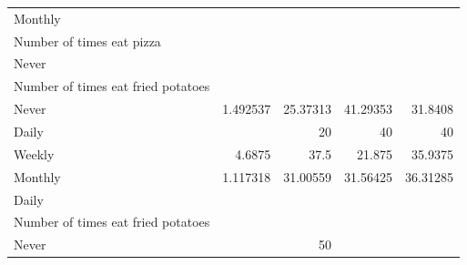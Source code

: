 \documentclass{article}
\begin{document}
\begin{table}[!h]
{\begin{tabular}{lllll}
			\multicolumn{1}{l}{\hspace{1em}Monthly} &
			\multicolumn{1}{|r}{} &
			\multicolumn{1}{r}{} &
			\multicolumn{1}{r}{} &
			\multicolumn{1}{r}{} \\
			\multicolumn{1}{l}{\hspace{2em}Number of times eat pizza} &
			\multicolumn{1}{|r}{} &
			\multicolumn{1}{r}{} &
			\multicolumn{1}{r}{} &
			\multicolumn{1}{r}{} \\
			\multicolumn{1}{l}{\hspace{3em}Never} &
			\multicolumn{1}{|r}{} &
			\multicolumn{1}{r}{} &
			\multicolumn{1}{r}{} &
			\multicolumn{1}{r}{} \\
			\multicolumn{1}{l}{\hspace{4em}Number of times eat fried potatoes} &
			\multicolumn{1}{|r}{} &
			\multicolumn{1}{r}{} &
			\multicolumn{1}{r}{} &
			\multicolumn{1}{r}{} \\
			\multicolumn{1}{l}{\hspace{5em}Never} &
			\multicolumn{1}{|r}{1.492537} &
			\multicolumn{1}{r}{25.37313} &
			\multicolumn{1}{r}{41.29353} &
			\multicolumn{1}{r}{31.8408} \\
			\multicolumn{1}{l}{\hspace{5em}Daily} &
			\multicolumn{1}{|r}{} &
			\multicolumn{1}{r}{20} &
			\multicolumn{1}{r}{40} &
			\multicolumn{1}{r}{40} \\
			\multicolumn{1}{l}{\hspace{5em}Weekly} &
			\multicolumn{1}{|r}{4.6875} &
			\multicolumn{1}{r}{37.5} &
			\multicolumn{1}{r}{21.875} &
			\multicolumn{1}{r}{35.9375} \\
			\multicolumn{1}{l}{\hspace{5em}Monthly} &
			\multicolumn{1}{|r}{1.117318} &
			\multicolumn{1}{r}{31.00559} &
			\multicolumn{1}{r}{31.56425} &
			\multicolumn{1}{r}{36.31285} \\
			\multicolumn{1}{l}{\hspace{3em}Daily} &
			\multicolumn{1}{|r}{} &
			\multicolumn{1}{r}{} &
			\multicolumn{1}{r}{} &
			\multicolumn{1}{r}{} \\
			\multicolumn{1}{l}{\hspace{4em}Number of times eat fried potatoes} &
			\multicolumn{1}{|r}{} &
			\multicolumn{1}{r}{} &
			\multicolumn{1}{r}{} &
			\multicolumn{1}{r}{} \\
			\multicolumn{1}{l}{\hspace{5em}Never} &
			\multicolumn{1}{|r}{} &
			\multicolumn{1}{r}{50} &

\end{tabular}}
\end{table}
\end{document}
